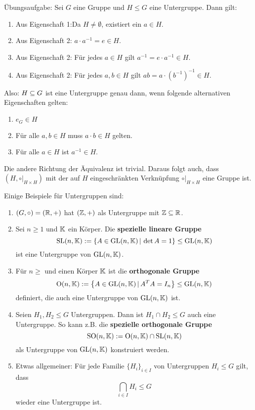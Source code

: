 \begin{bemerkung} Übungsaufgabe:
Sei $G$ eine Gruppe und $H \leq G$ eine Untergruppe. Dann gilt:
\begin{enumerate}
\item Aus Eigenschaft 1:Da $H \neq \emptyset$, existiert ein $a \in H$.
\item Aus Eigenschaft 2: $a \cdot a^{-1} = e \in H$.
\item Aus Eigenschaft 2: Für jedes $a \in H$ gilt $a^{-1} = e \cdot a^{-1} \in H$.
\item Aus Eigenschaft 2: Für jedes $a,b \in H$ gilt $ab = a \cdot (b^{-1})^{-1} \in H$.
\end{enumerate}
Also: $H \subseteq G$ ist eine Untergruppe genau dann, wenn folgende alternativen Eigenschaften gelten:
\begin{enumerate}[1.{$^\ast $}]
\item $e_G \in H$
\item Für alle $a,b \in H$ muss $a \cdot b \in H$ gelten.
\item Für alle $a \in H$ ist $a^{-1} \in H$.
\end{enumerate}
Die andere Richtung der Äquivalenz ist trivial. Daraus folgt auch, dass $(H, \circ|_{H \times H})$ mit der auf $H$ eingeschränkten Verknüpfung $\circ|_{H \times H}$ eine Gruppe ist. 
\end{bemerkung}
\begin{beispiele}
Einige Beispiele für Untergruppen sind:
\begin{enumerate}
\item $(G, \circ) = (\mathbb{R}, +)$ hat $(\mathbb{Z}, +)$ als Untergruppe mit $\mathbb{Z} \subseteq \mathbb{R}$.
\item Sei $n \geq 1$ und $\mathbb{K}$ ein Körper. Die \textbf{spezielle lineare Gruppe}
\begin{equation}
\text{SL} (n, \mathbb{K}) := \left\{ A \in \text{GL}(n, \mathbb{K}) \, | \, \det A = 1\right\} \leq \text{GL}(n, \mathbb{K})
\end{equation}
ist eine Untergruppe von $\text{GL}(n,\mathbb{K})$.
\item Für $n \geq$ und einen Körper $\mathbb{K}$ ist die \textbf{orthogonale Gruppe}
\begin{equation}
\text{O}(n, \mathbb{K}) := \left\{ A \in \text{GL}(n, \mathbb{K}) \, | \, A^TA = I_n \right\} \leq \text{GL}(n, \mathbb{K})
\end{equation}
definiert, die auch eine Untergruppe von $\text{GL}(n, \mathbb{K})$ ist.
\item Seien $H_1, H_2 \leq G$ Untergruppen. Dann ist $H_1 \cap H_2 \leq G$ auch eine Untergruppe. So kann z.B. die \textbf{spezielle orthogonale Gruppe}
\begin{equation}
\text{SO}(n, \mathbb{K}) := \text{O}(n, \mathbb{K}) \cap \text{SL}(n, \mathbb{K})
\end{equation}
als Untergruppe von $\text{GL}(n, \mathbb{K})$ konstruiert werden.
\item Etwas allgemeiner: Für jede Familie $\{H_i\}_{i\in I}$ von Untergruppen $H_i \leq G$ gilt, dass
\begin{equation}
\bigcap_{i \in I} H_i \leq G
\end{equation}
wieder eine Untergruppe ist.
\end{enumerate}
\end{beispiele}
